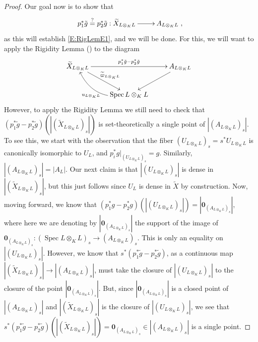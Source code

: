 \documentclass[11pt, reqno]{amsart}
\numberwithin{equation}{section}
\theoremstyle{definition}
\theoremstyle{remark}
\DeclareMathOperator{\spec}{Spec}
\begin{document}
\begin{proof}
Our goal now is to show that
\begin{equation}\label{E:RigLemE2}
\xymatrix{
 p_1^*\tilde g \stackrel?= p_2^*\tilde g: \widetilde X_{L\otimes_KL}\ar[r] & A_{L\otimes_KL}},
\end{equation}
as this will establish \eqref{E:RigLemE1}, and we will be done.
               For this, we will want to apply the Rigidity Lemma () to the diagram
\begin{equation}\label{E:RigLemDiagDesc}
\xymatrix{
\widetilde X_{L\otimes_KL} \ar[rr]^{p_1^*\tilde g - p_2^*\tilde g} \ar[dr]^{\widetilde\varpi_{L\otimes_KL}} & &A_{L\otimes_KL}\ar[dl]^{} \\
& \spec L\otimes_KL \ar@/^1.5pc/[ul]^{u_{L\otimes_KL}} & 
}
\end{equation}
However, to apply the Rigidity Lemma we still need to check that    $( {p_1^*\tilde g}-{p_2^*\tilde g})(|(\widetilde X_{L\otimes_KL})_s|)$ is set-theoretically a single point of $|(A_{L\otimes_K L})_s|$. 
To see this, we start with the observation that the fiber $(U_{L\otimes_KL})_s =
s^*U_{L\otimes_KL}$ is canonically isomorphic to $U_L$, and
$p_i^*g|_{(U_{L\otimes_KL})_s}  = g$.  Similarly, $|(A_{L\otimes_K L})_s|=|A_L|$.
Our next claim is that $|(U_{L\otimes_KL})_s|$ is dense in $|(\widetilde X_{L\otimes_KL})_s|$, but this just follows since $U_L$ is dense in $\widetilde X$ by construction.  
  Now,  moving forward, we know that $(p_1^*g-p_2^*g)(|(U_{L\otimes_KL})_s|)=|\mathbf 0_{(A_{L\otimes_KL})_s}|$, where here we are denoting by $|\mathbf 0_{(A_{L\otimes_KL})_s}|$ the support of the image of $\mathbf 0_{(A_{L\otimes_KL})_s}:(\operatorname{Spec}L\otimes_K L)_s\to (A_{L\otimes_KL})_s$. 
 This is only an equality on $|(U_{L\otimes_KL})_s|$. 
 However, we know that $s^*({p_1^*\tilde g}-{p_2^*\tilde g})$, as a continuous map $|(\widetilde X_{L\otimes_K L})_s|\to |(A_{L\otimes_KL})_s|$, must take the closure of  $|(U_{L\otimes_K L})_s|$ to the closure of the point $|\mathbf 0_{(A_{L\otimes_KL})_s}|$. 
 But, since $|\mathbf 0_{(A_{L\otimes_KL})_s}|$ is a closed point of $|(A_{L\otimes_KL})_s|$ and $|(\widetilde X_{L\otimes_K L})_s|$ is the closure of $|(U_{L\otimes_K L})_s|$, we see that $s^*( {p_1^*\tilde g}-{p_2^*\tilde g})(|(\widetilde X_{L\otimes_KL} )_s|)=\mathbf 0_{(A_{L\otimes_KL})_s}\in |(A_{L\otimes_KL})_s|$ is a single point. 
 


\end{proof}
\end{document}
